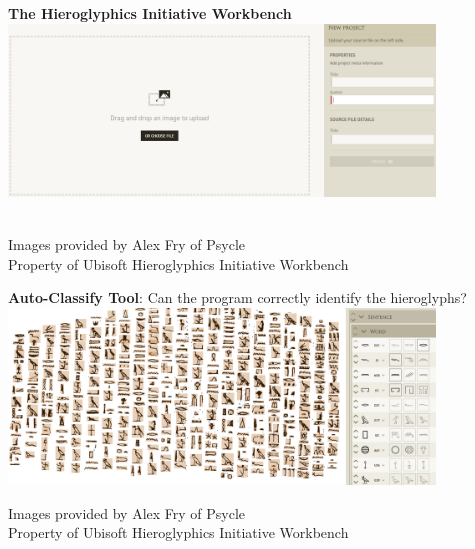 \documentclass[unknownkeysallowed,usepdftitle=false, parskip=full, aspectratio=169]{beamer}
\newcommand{\secvariable}{nothing}
\newcommand{\mysection}[1]{\renewcommand{\secvariable}{#1}
}
\begin{document}
\mysection{radar}

\begin{frame}
\label{\secvariable}

\begin{center}
\vfill
\textbf{The Hieroglyphics Initiative Workbench}
\vspace{0.8cm}
\includegraphics[width=0.85\textwidth,keepaspectratio]{figure/workbench_2.PNG}
\vfill
\end{center}
\tiny
\\Images provided by Alex Fry of Psycle
\\Property of Ubisoft Hieroglyphics Initiative Workbench
\vfill

\end{frame}

\mysection{line}

\begin{frame}\label{\secvariable}

\begin{center}
\vspace{0.05cm}
\textbf{Auto-Classify Tool}: Can the program correctly identify the hieroglyphs?
\vfill
\includegraphics[width=0.85\textwidth,keepaspectratio]{figure/PICO_36.png}
\end{center}
\parbox{\linewidth}{\tiny Images provided by Alex Fry of Psycle
\\Property of Ubisoft Hieroglyphics Initiative Workbench}

\end{frame}
\end{document}
